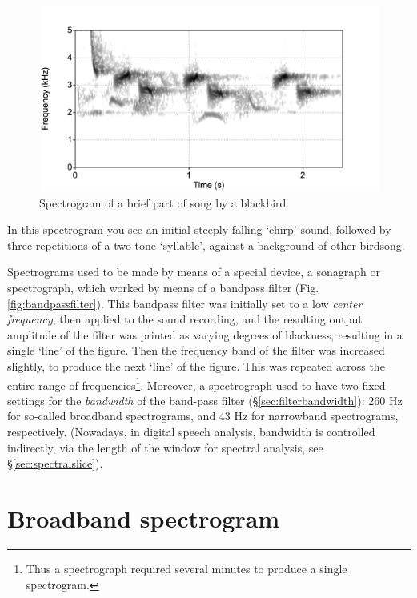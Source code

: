 \documentclass[
]{book}
\begin{document}
\begin{figure}

{\centering \includegraphics{figures/merel-spectrogram} 

}

\caption{Spectrogram of a brief part of song by a blackbird.}\label{fig:merel-spectrogram}
\end{figure}

In this spectrogram you see an initial steeply falling `chirp' sound, followed by three repetitions of a two-tone `syllable', against a background of other birdsong.

Spectrograms used to be made by means of a special device, a sonagraph or spectrograph, which worked by means of a bandpass filter (Fig.\ref{fig:bandpassfilter}). This bandpass filter was initially set to a low \emph{center frequency}, then applied to the sound recording, and the resulting output amplitude of the filter was printed as varying degrees of blackness, resulting in a single `line' of the figure. Then the frequency band of the filter was increased slightly, to produce the next `line' of the figure. This was repeated across the entire range of frequencies\footnote{Thus a spectrograph required several minutes to produce a single spectrogram.}. Moreover, a spectrograph used to have two fixed settings for the \emph{bandwidth} of the band-pass filter (§\ref{sec:filterbandwidth}): 260 Hz for so-called broadband spectrograms, and 43 Hz for narrowband spectrograms, respectively. (Nowadays, in digital speech analysis, bandwidth is controlled indirectly, via the length of the window for spectral analysis, see §\ref{sec:spectralslice}).

\section{Broadband spectrogram}\label{broadband-spectrogram}
\end{document}
